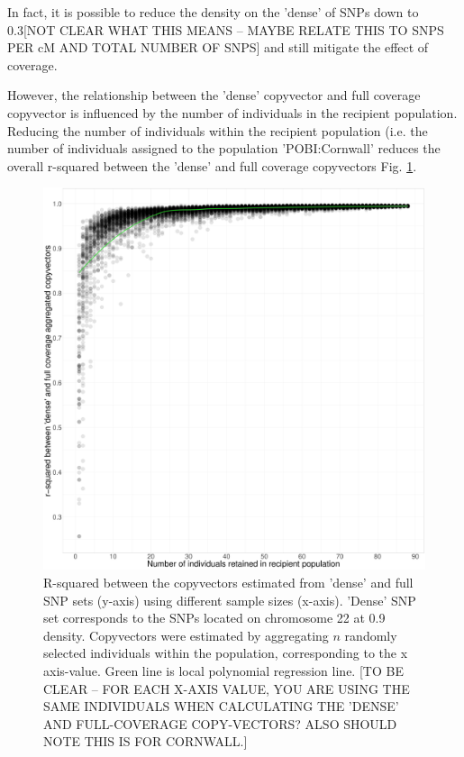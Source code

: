 In fact, it is possible to reduce the density on the 'dense' of SNPs down to {\color{red}0.3[NOT CLEAR WHAT THIS MEANS -- MAYBE RELATE THIS TO SNPS PER cM AND TOTAL NUMBER OF SNPS]} and still mitigate the effect of coverage.

However, the relationship between the 'dense' copyvector and full coverage copyvector is influenced by the number of individuals in the recipient population. Reducing the number of individuals within the recipient population (i.e. the number of individuals assigned to the population 'POBI:Cornwall' reduces the overall r-squared between the 'dense' and full coverage copyvectors Fig. \ref{fig:Ssparse_cornwall_collapsed_random_remove_inds}.

\begin{figure}[htp]
    \centering
    \includegraphics[width=1.0\textwidth]{../images/chapter1/Ssparse_cornwall_collapsed_random_remove_inds.pdf}
    \caption{R-squared between the copyvectors estimated from 'dense' and full SNP sets (y-axis) using different sample sizes (x-axis). 'Dense' SNP set corresponds to the SNPs located on chromosome 22 at 0.9 density. Copyvectors were estimated by aggregating $n$ randomly selected individuals within the population, corresponding to the x axis-value. Green line is local polynomial regression line. {\color{red}[TO BE CLEAR -- FOR EACH X-AXIS VALUE, YOU ARE USING THE SAME INDIVIDUALS WHEN CALCULATING THE 'DENSE' AND FULL-COVERAGE COPY-VECTORS? ALSO SHOULD NOTE THIS IS FOR CORNWALL.]}}
    \label{fig:Ssparse_cornwall_collapsed_random_remove_inds}
\end{figure}

